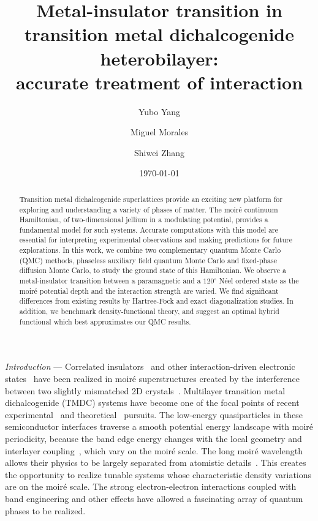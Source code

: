 \documentclass[aps,prb,showpacs,preprintnumbers,amsmath,amssymb,superscriptaddress,twocolumn]{revtex4-1}
\newcommand{\ssec}[1]{\emph{#1} ---}
\begin{document}
\title{Metal-insulator transition in transition metal dichalcogenide heterobilayer: \\
accurate treatment of interaction}
\author{Yubo Yang}
\author{Miguel Morales}
\author{Shiwei Zhang}
\date{\today}
\begin{abstract}
Transition metal dichalcogenide superlattices provide an exciting new platform for exploring and understanding a variety of phases of matter.
The moir\'e continuum Hamiltonian, of two-dimensional
jellium in a modulating potential,
provides a fundamental model for such systems.
Accurate computations with this model are essential for interpreting experimental observations and making predictions for future explorations.
In this work, we combine two complementary quantum Monte Carlo (QMC) methods, phaseless auxiliary field quantum Monte Carlo and fixed-phase diffusion Monte Carlo, to study the ground state of this Hamiltonian.
We observe a metal-insulator transition between a paramagnetic and a $120^\circ$ N\'eel ordered state as the moir\'e potential depth and the interaction strength are varied.
We find significant differences from existing results by Hartree-Fock and exact diagonalization studies.
In addition, we benchmark density-functional theory, and suggest an optimal hybrid functional which best approximates our QMC results.
\end{abstract}
\pacs{}
\maketitle

\ssec{Introduction}
Correlated insulators~\cite{Tang2020,Xu2020,Regan2020,Wang2020,Shabani2021,Huang2021} and other interaction-driven electronic states~\cite{Jin2021,Wang2022,Tao2022,Zhao2022} have been realized in moir\'e superstructures created by the interference between two slightly mismatched 2D crystals~\cite{Mak2022}.
Multilayer transition metal dichalcogenide (TMDC) systems
have become one of the focal points of recent experimental~\cite{Foutty2022,Zhao2022} and theoretical~\cite{Davydova2022,Guerci2022} pursuits.
The low-energy quasiparticles in these semiconductor interfaces traverse a smooth potential energy landscape with moir\'e periodicity, because the band edge energy changes with the local geometry and interlayer coupling~\cite{Li2021d,Nieken2022}, which vary on the moir\'e scale.
The long moir\'e wavelength allows their physics to be largely separated from atomistic details~\cite{Padhi2021}. This creates the opportunity to realize tunable systems whose characteristic density variations are on the moir\'e scale. The strong electron-electron interactions coupled with band engineering and other effects have allowed a fascinating array of quantum phases to be realized.
\end{document}
